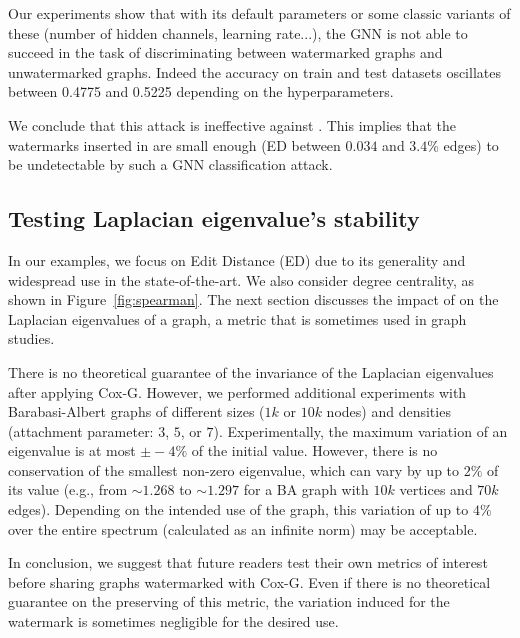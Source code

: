 Our experiments show that with its default parameters or some classic variants of these (number of hidden channels, learning rate...), the GNN is not able to succeed in the task of discriminating between watermarked graphs and unwatermarked graphs. Indeed the accuracy on train and test datasets oscillates between 0.4775 and 0.5225 depending on the hyperparameters.

We conclude that this attack is ineffective against \scheme. This implies that the watermarks inserted in \scheme are small enough (ED between $0.034$ and $3.4$\% edges) to be undetectable by such a GNN classification attack.

\subsection{Testing Laplacian eigenvalue's stability}
In our examples, we focus on Edit Distance (ED) due to its generality and widespread use in the state-of-the-art. We also consider degree centrality, as shown in Figure~\ref{fig:spearman}. The next section discusses the impact of \scheme on the Laplacian eigenvalues of a graph, a metric that is sometimes used in graph studies. 

There is no theoretical guarantee of the invariance of the Laplacian eigenvalues after applying Cox-G. However, we performed additional experiments with Barabasi-Albert graphs of different sizes ($1k$ or $10k$ nodes) and densities (attachment parameter: $3$, $5$, or $7$). Experimentally, the maximum variation of an eigenvalue is at most $\pm-4\%$ of the initial value. However, there is no conservation of the smallest non-zero eigenvalue, which can vary by up to $2\%$ of its value (e.g., from $\sim 1.268$ to $\sim 1.297$ for a BA graph with $10k$ vertices and $70k$ edges). Depending on the intended use of the graph, this variation of up to $4\%$ over the entire spectrum (calculated as an infinite norm) may be acceptable.

In conclusion, we suggest that future readers test their own metrics of interest before sharing graphs watermarked with Cox-G. Even if there is no theoretical guarantee on the preserving of this metric, the variation induced for the watermark is sometimes negligible for the desired use.